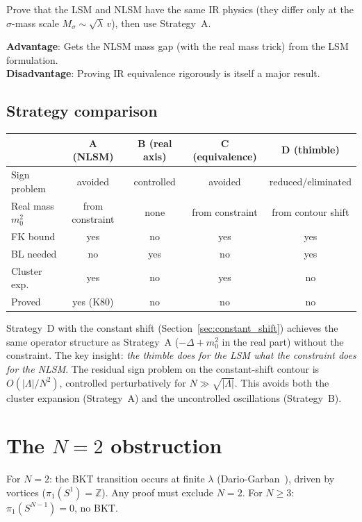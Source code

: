 \documentclass[12pt]{article}
\theoremstyle{definition}
\theoremstyle{remark}
\newcommand{\Z}{\mathbb{Z}}
\newcommand{\La}{\Lambda}
\begin{document}
Prove that the LSM and NLSM have the same IR physics (they differ
only at the $\sigma$-mass scale $M_\sigma \sim \sqrt{\lambda}\,v$),
then use Strategy~A.

\textbf{Advantage}: Gets the NLSM mass gap (with the real mass trick)
from the LSM formulation.\\
\textbf{Disadvantage}: Proving IR equivalence rigorously is itself
a major result.

\subsection{Strategy comparison}

\begin{center}
\begin{tabular}{|l|c|c|c|c|}
\hline
& A (NLSM) & B (real axis) & C (equivalence) & D (thimble) \\
\hline
Sign problem & avoided & controlled & avoided & reduced/eliminated \\
Real mass $m_0^2$ & from constraint & none & from constraint & from contour shift \\
FK bound & yes & no & yes & yes \\
BL needed & no & yes & no & yes \\
Cluster exp.\ & yes & no & yes & no \\
Proved & yes (K80) & no & no & no \\
\hline
\end{tabular}
\end{center}

Strategy~D with the constant shift (Section~\ref{sec:constant_shift})
achieves the same operator structure as Strategy~A ($-\Delta+m_0^2$
in the real part) without the constraint. The key insight: \emph{the
thimble does for the LSM what the constraint does for the NLSM}.
The residual sign problem on the constant-shift contour is
$O(|\La|/N^2)$, controlled perturbatively for $N \gg \sqrt{|\La|}$.
This avoids both the cluster expansion (Strategy~A) and the
uncontrolled oscillations (Strategy~B).

\section{The $N = 2$ obstruction}

For $N = 2$: the BKT transition occurs at finite $\lambda$
(Dario-Garban~\cite{DG25}), driven by vortices ($\pi_1(S^1)=\Z$).
Any proof must exclude $N = 2$. For $N \ge 3$: $\pi_1(S^{N-1})=0$,
no BKT.
\end{document}

